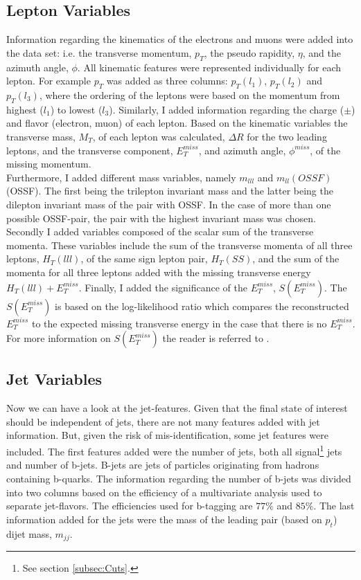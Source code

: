\subsection{Lepton Variables}\label{subsec:LepSel}
Information regarding the kinematics of the electrons and muons were added into the data set: i.e. the transverse momentum, $p_T$, the pseudo 
rapidity, $\eta$, and the azimuth angle, $\phi$. All kinematic features were represented individually for each lepton. For example $p_T$
was added as three columns: $p_T(l_1)$, $p_T(l_2)$ and $p_T(l_3)$, where the ordering of the leptons were based on the momentum from highest ($l_1$) 
to lowest ($l_3$). Similarly, I added information regarding the charge ($\pm$) and flavor (electron, muon) of each lepton. Based on the kinematic variables
the transverse mass, $M_T$, of each lepton was calculated, $\Delta R$ for the two leading leptons, and the transverse component, $E_T^{miss}$, and azimuth angle,
$\phi^{miss}$, of the missing momentum.
\\
Furthermore, I added different mass variables, namely $m_{lll}$ and $m_{ll}(OSSF)$ (\ac{OSSF}). The first being the trilepton invariant mass 
and the latter being the dilepton invariant mass of the pair with \ac{OSSF}. In the case of more than one possible \ac{OSSF}-pair,
the pair with the highest invariant mass was chosen. Secondly I added variables composed of the scalar sum of the transverse momenta.
These variables include the sum of the transverse momenta of all three leptons, $H_T(lll)$, of the same sign lepton pair, $H_T(SS)$, and the sum of 
the momenta for all three leptons added with the missing transverse energy $H_T(lll) + E_T^{miss}$. Finally, I added the significance of the
$E_T^{miss}$, $S(E_T^{miss})$. The $S(E_T^{miss})$ is based on the log-likelihood ratio which compares the reconstructed $E_T^{miss}$ to 
the expected missing transverse energy in the case that there is no $E_T^{miss}$. For more information on $S(E_T^{miss})$ the reader is 
referred to \cite{object_based_2018}.
\subsection{Jet Variables}\label{subsec:JetSel}
Now we can have a look at the jet-features. Given that the final state of interest should be independent of jets, there are 
not many features added with jet information. But, given the risk of mis-identification, some jet features were included. The 
first features added were the number of jets, both all signal\footnote{See section \ref{subsec:Cuts}.} jets and number of b-jets.
B-jets are jets of particles originating from hadrons containing b-quarks. The information regarding the number of b-jets was divided into 
two columns based on the efficiency of a multivariate analysis used to separate jet-flavors. The efficiencies used for b-tagging are $77\%$ and $85\%$. 
The last information added for the jets were the mass of the leading pair (based on $p_t$) dijet mass, $m_{jj}$.